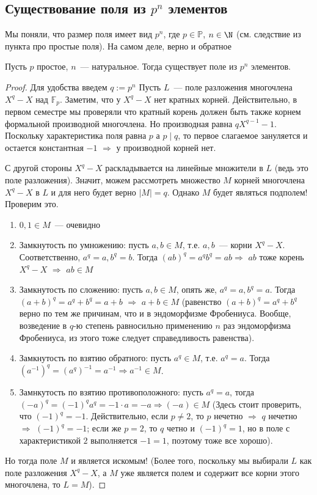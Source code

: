 \subsection{Существование поля из $p^n$ элементов}
Мы поняли, что размер поля имеет вид $p^n$, где $p\in\mathbb{P}$, $n\in \N$ (см. следствие из пункта про простые поля).
На самом деле, верно и обратное
\begin{theorem-non}
    Пусть $p$ простое, $n$~--- натуральное.
    Тогда существует поле из $p^n$ элементов.
\end{theorem-non}
\begin{proof}
    Для удобства введем $q := p^n$
    Пусть $L$~--- поле разложения многочлена $X^q-X$ над $\mathbb{F}_p$.
    Заметим, что у $X^q-X$ нет кратных корней.
    Действительно, в первом семестре мы проверяли что кратный корень должен быть также корнем формальной производной многочлена.
    Но производная равна $qX^{q-1}-1$.
    Поскольку характеристика поля равна $p$ а $p\mid q$, то первое слагаемое зануляется и остается константная $-1$ $\Rightarrow$ у производной корней нет.

    С другой стороны $X^q-X$ раскладывается на линейные множители в $L$ (ведь это поле разложения).
    Значит, можем рассмотреть множество $M$ корней многочлена $X^q-X$ в $L$ и для него будет верно $|M|=q$.
    Однако $M$ будет являться подполем!
    Проверим это.
    \begin{enumerate}
        \item $0,1\in M$~--- очевидно
        \item Замкнутость по умножению: пусть $a, b\in M$, т.е. $a,b$~--- корни $X^q-X$.
        Соответственно, $a^q=a, b^q=b$.
        Тогда $(ab)^q=a^q b^q = ab \Rightarrow$ $ab$ тоже корень $X^q-X$ $\Rightarrow$ $ab\in M$
        \item Замкнутость по сложению: пусть $a, b\in M$, опять же, $a^q=a, b^q=a$.
        Тогда $(a+b)^q = a^q + b^q = a + b$ $\Rightarrow$ $a+b \in M$ (равенство $(a+b)^q = a^q+b^q$ верно по тем же причинам, что и в эндоморфизме Фробениуса. Вообще, возведение в $q$-ю степень равносильно применению $n$ раз эндоморфизма Фробениуса, из этого тоже следует справедливость равенства).
        \item Замкнутость по взятию обратного: пусть $a^q \in M$, т.е. $a^q=a$. Тогда $(a^{-1})^q = (a^q)^{-1}=a^{-1} \Rightarrow a^{-1} \in M$.
        \item Замнкутость по взятию противоположного: пусть $a^q=a$, тогда $(-a)^q = (-1)^q a^q = -1 \cdot a = -a \Rightarrow (-a) \in M$  (Здесь стоит проверить, что $(-1)^q=-1$. Действительно, если $p\neq 2$, то $p$ нечетно $\Rightarrow$ $q$ нечетно $\Rightarrow$ $(-1)^q = -1$; если же $p = 2$, то $q$ четно и $(-1)^q=1$, но в поле с характеристикой $2$ выполняется $-1=1$, поэтому тоже все хорошо).
    \end{enumerate}\medskip

    Но тогда поле $M$ и является искомым!
    (Более того, поскольку мы выбирали $L$ как поле разложения $X^q-X$, а $M$ уже является полем и содержит все корни этого многочлена, то $L=M$).
\end{proof}

